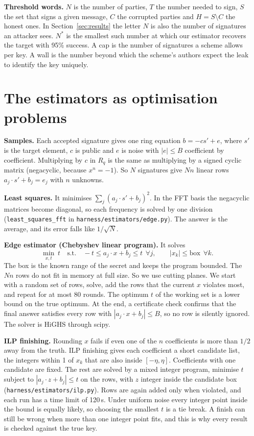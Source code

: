 \documentclass[10pt,conference,a4paper]{IEEEtran}
\begin{document}
\textbf{Threshold words.} $N$ is the number of parties, $T$ the number needed to sign, $S$ the set that signs a given
message, $C$ the corrupted parties and $H=S\setminus C$ the honest ones. In Section~\ref{sec:results} the letter $N$ is also
the number of signatures an attacker sees. $N^*$ is the smallest such number at which our estimator recovers the target with
95\% success. A cap is the number of signatures a scheme allows per key. A wall is the number beyond which the scheme's
authors expect the leak to identify the key uniquely.

\section{The estimators as optimisation problems}\label{app:estimators}
\textbf{Samples.} Each accepted signature gives one ring equation $b=-c s'+e$, where $s'$ is the target element, $c$ is
public and $e$ is noise with $|e|\le B$ coefficient by coefficient. Multiplying by $c$ in $R_q$ is the same as multiplying
by a signed cyclic matrix (negacyclic, because $x^n=-1$). So $N$ signatures give $N n$ linear rows $a_j\cdot s'+b_j=e_j$
with $n$ unknowns.

\textbf{Least squares.} It minimises $\sum_j (a_j\cdot s'+b_j)^2$. In the FFT basis the negacyclic matrices become
diagonal, so each frequency is solved by one division (\texttt{least\_squares\_fft} in
\texttt{harness/estimators/edge.py}). The answer is the average, and its error falls like $1/\sqrt N$.

\textbf{Edge estimator (Chebyshev linear program).} It solves
\begin{equation*}
\min_{x,t}\ t \quad\text{s.t.}\quad -t\le a_j\cdot x+b_j\le t\ \ \forall j,\qquad |x_k|\le \mathrm{box}\ \ \forall k.
\end{equation*}
The box is the known range of the secret and keeps the program bounded. The $N n$ rows do not fit in memory at full size.
So we use cutting planes. We start with a random set of rows, solve, add the rows that the current $x$ violates most, and
repeat for at most 80 rounds. The optimum $t$ of the working set is a lower bound on the true optimum. At the end, a
certificate check confirms that the final answer satisfies every row with $|a_j\cdot x+b_j|\le B$, so no row is silently
ignored. The solver is HiGHS through scipy.

\textbf{ILP finishing.} Rounding $x$ fails if even one of the $n$ coefficients is more than $1/2$ away from the truth. ILP
finishing gives each coefficient a short candidate list, the integers within 1 of $x_k$ that are also inside
$[-\eta,\eta]$. Coefficients with one candidate are fixed. The rest are solved by a mixed integer program, minimise $t$
subject to $|a_j\cdot z+b_j|\le t$ on the rows, with $z$ integer inside the candidate box
(\texttt{harness/estimators/ilp.py}). Rows are again added only when violated, and each run has a time limit of 120\,s.
Under uniform noise every integer point inside the bound is equally likely, so choosing the smallest $t$ is a tie break. A
finish can still be wrong when more than one integer point fits, and this is why every result is checked against the true
key.
\end{document}
